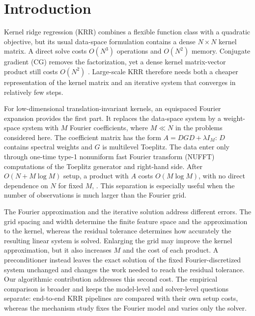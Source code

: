 \section{Introduction}
\label{sec:introduction}

Kernel ridge regression (KRR) combines a flexible function class with a
quadratic objective, but its usual data-space formulation contains a dense
\(N\times N\) kernel matrix. A direct solve costs \(O(N^3)\) operations and
\(O(N^2)\) memory. Conjugate gradient (CG) removes the factorization, yet a
dense kernel matrix-vector product still costs \(O(N^2)\)
\cite{aronszajn1950theory,kimeldorf1971some,golub2013matrix,trefethen1997numerical}.
Large-scale KRR therefore needs both a cheaper representation of the kernel
matrix and an iterative system that converges in relatively few steps.

For low-dimensional translation-invariant kernels, an equispaced Fourier
expansion provides the first part. It replaces the data-space system by a
weight-space system with \(M\) Fourier coefficients, where \(M\ll N\) in the
problems considered here. The coefficient matrix has the form
\(A=DGD+\lambda I_M\): \(D\) contains spectral weights and \(G\) is multilevel
Toeplitz. The data enter only through one-time type-1 nonuniform fast Fourier
transform (NUFFT) computations of the Toeplitz generator and right-hand side.
After \(O(N+M\log M)\) setup, a product with \(A\) costs
\(O(M\log M)\), with no direct dependence on \(N\) for fixed \(M\),
\cite{greengard2025efgp,barnett2024uniform}. This separation is especially
useful when the number of observations is much larger than the Fourier grid.

The Fourier approximation and the iterative solution address different
errors. The grid spacing and width determine the finite feature space and the
approximation to the kernel, whereas the residual tolerance determines how
accurately the resulting linear system is solved. Enlarging the grid may
improve the kernel approximation, but it also increases \(M\) and the cost of
each product. A preconditioner instead leaves the exact solution of the fixed
Fourier-discretized system unchanged and changes the work needed to reach the
residual tolerance.  Our algorithmic contribution addresses this second cost.
The empirical comparison is broader and keeps the model-level and solver-level
questions separate: end-to-end KRR pipelines are compared with their own setup
costs, whereas the mechanism study fixes the Fourier model and varies only the
solver.

